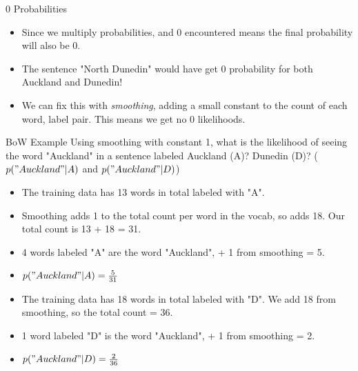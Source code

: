 \documentclass[aspectratio=169, 10pt]{beamer}
\begin{document}
\begin{frame}{0 Probabilities}
    \begin{itemize}
        \item Since we multiply probabilities, and 0 encountered means the final probability will also be 0.
        \item The sentence "North Dunedin" would have get 0 probability for both Auckland and Dunedin!
        \item We can fix this with \textit{smoothing}, adding a small constant to the count of each word, label pair. This means we get no 0 likelihoods.
    \end{itemize}
\end{frame}

\begin{frame}{BoW Example}
 Using smoothing with constant 1, what is the likelihood of seeing the word "Auckland" in a sentence labeled Auckland (A)? Dunedin (D)? ($p("Auckland"|A)$ and $p("Auckland"|D)$)
 \pause
 \begin{itemize}
     \item The training data has 13 words in total labeled with "A".
     \item Smoothing adds 1 to the total count per word in the vocab, so adds 18. Our total count is 13 + 18 = 31.
     \item 4 words labeled "A" are the word "Auckland", + 1 from smoothing = 5.
     \item $p("Auckland"|A) = \frac{5}{31}$
     \pause
     \item The training data has 18 words in total labeled with "D". We add 18 from smoothing, so the total count = 36.
     \item 1 word labeled "D" is the word "Auckland", + 1 from smoothing = 2.
     \item $p("Auckland"|D) = \frac{2}{36}$
 \end{itemize}
\end{frame}
\end{document}
